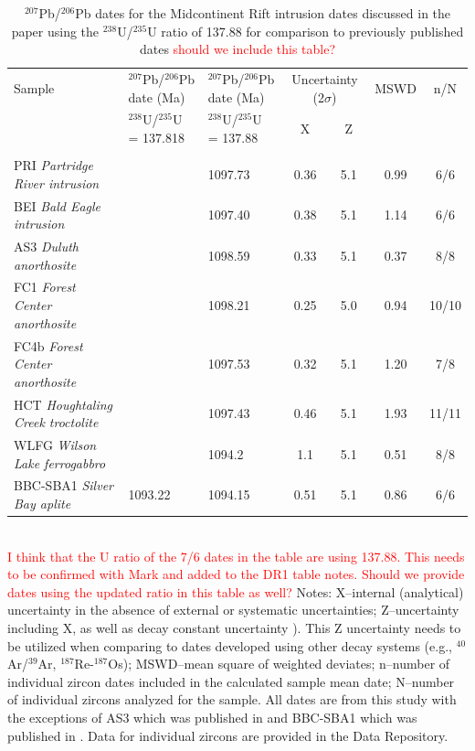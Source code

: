 \documentclass[11pt,letterpaper]{article}
\begin{document}
\renewcommand{\thetable}{DR\arabic{table}}
\addtocounter{table}{1}
\begin{table}[h!]
\footnotesize
\caption{$^{207}$Pb/$^{206}$Pb dates for the Midcontinent Rift intrusion dates discussed in the paper using the \cite{Steiger1977a} $^{238}$U/$^{235}$U ratio of 137.88 for comparison to previously published dates {\footnotesize\textcolor{red}{should we include this table?}}}
\begin{tabular}{|p{3 cm}|p{3.4 cm}|p{3.4 cm}|cc|c|c|}
\hline
Sample & $^{207}$Pb/$^{206}$Pb date (Ma) & $^{207}$Pb/$^{206}$Pb date (Ma) & \multicolumn{2}{|c|}{Uncertainty (2$\sigma$)} & MSWD & n/N \\
 &  $^{238}$U/$^{235}$U = 137.818 & $^{238}$U/$^{235}$U = 137.88 & X & Z & & \\
  &  \cite{Hiess2012a} & \cite{Steiger1977a} &  & & & \\
\hline
PRI \textit{Partridge River intrusion}  & & 1097.73  & 0.36 & 5.1 & 0.99 & 6/6 \\
\hline
BEI \textit{Bald Eagle intrusion} &  & 1097.40 & 0.38 & 5.1 & 1.14 & 6/6 \\
\hline
AS3 \textit{Duluth anorthosite} &  &  1098.59 & 0.33 & 5.1 & 0.37 & 8/8 \\
\hline
FC1 \textit{Forest Center anorthosite}   & & 1098.21 & 0.25 & 5.0 & 0.94 & 10/10 \\
\hline
FC4b \textit{Forest Center anorthosite}   &  & 1097.53 & 0.32 & 5.1 & 1.20 & 7/8 \\
\hline
HCT \textit{Houghtaling Creek troctolite}   & & 1097.43 & 0.46 & 5.1 & 1.93 & 11/11 \\
\hline
WLFG \textit{Wilson Lake ferrogabbro}   & & 1094.2 & 1.1 & 5.1 & 0.51 & 8/8 \\
\hline
BBC-SBA1 \textit{Silver Bay aplite}  &  1093.22 & 1094.15 & 0.51 &5.1 & 0.86 & 6/6 \\
\hline
\end{tabular}\\
\textcolor{red}{I think that the U ratio of the 7/6 dates in the table are using 137.88. This needs to be confirmed with Mark and added to the DR1 table notes. Should we provide dates using the updated ratio in this table as well?}
Notes: X--internal (analytical) uncertainty in the absence of external or systematic uncertainties; Z--uncertainty including X, as well as decay constant uncertainty \citep{Jaffey1971a}). This Z uncertainty needs to be utilized when comparing to dates developed using other decay systems (e.g., $^{40}$Ar/$^{39}$Ar, $^{187}$Re-$^{187}$Os); MSWD--mean square of weighted deviates; n--number of individual zircon dates included in the calculated sample mean date; N--number of individual zircons analyzed for the sample. All dates are from this study with the exceptions of AS3 which was published in \cite{Schoene2006a} and BBC-SBA1 which was published in \cite{Fairchild2017a}. Data for individual zircons are provided in the Data Repository.
\label{tab:geochron}
\end{table}
\end{document}
